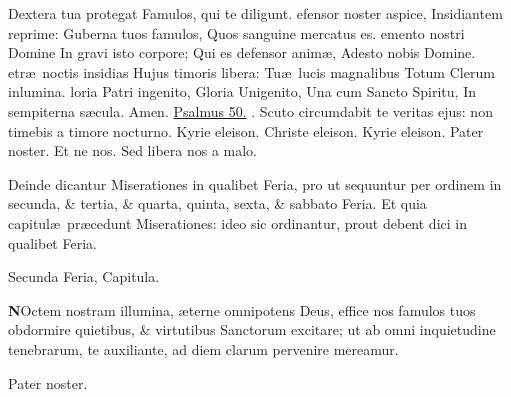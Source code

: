 \documentclass[letter,11pt]{book}
\makeatletter
\DeclareRobustCommand{\Vbar}{\vers@resp{-0.1em}{V}}
\newcommand{\vers@resp@sym}{\raisebox{0.2ex}{\rotatebox[origin=c]{-20}{$\m@th\rceil$}}}
\newcommand{\vers@resp}[2]{%
  {\ooalign{\hidewidth\kern#1\vers@resp@sym\hidewidth\cr#2\cr}}%
}%
\def\V{\color{Red} \Vbar . \color{black}}
\makeatother
\begin{document}
\begin{multicols*}{2}
\newline \indent Dextera tua protegat
\newline \indent Famulos, qui te diligunt.
efensor noster aspice,
\newline \indent Insidiantem reprime:
\newline \indent Guberna tuos famulos,
\newline \indent Quos sanguine mercatus es.
emento nostri Domine
\newline \indent In gravi isto corpore;
\newline \indent Qui es defensor anim\ae ,
\newline \indent Adesto nobis Domine.
etr\ae \ noctis insidias
\newline \indent Hujus timoris libera:
\newline \indent Tu\ae \ lucis magnalibus
\newline \indent Totum Clerum inlumina.
loria Patri ingenito,
\newline \indent Gloria Unigenito,
\newline \indent Una cum Sancto Spiritu,
\newline \indent In sempiterna s\ae cula. Amen.
\newline \hyperlink{ps50}{Psalmus 50.} \V Scuto circumdabit te veritas ejus: non timebis a timore nocturno. Kyrie eleison. Christe eleison. Kyrie eleison. Pater noster. Et ne nos. Sed libera nos a malo.%
\par \color{Red} Deinde dicantur Miserationes in qualibet Feria, pro ut sequuntur per ordinem in secunda, \& tertia, \& quarta, quinta, sexta, \& sabbato Feria. Et quia capitul\ae \ pr\ae cedunt Miserationes: ideo sic ordinantur, prout debent dici in qualibet Feria. \color{black}
\vspace{-.5em} \begin{center} \color{Red} Secunda Feria, Capitula. \end{center} \vspace{-.5em}
\lettrine[lines=2]{\bfseries \color{Red} N}{}Octem nostram illumina, \ae terne omnipotens Deus, effice nos famulos tuos obdormire quietibus, \& virtutibus Sanctorum excitare; ut ab omni inquietudine tenebrarum, te auxiliante, ad diem clarum pervenire mereamur.
\par Pater noster.

\end{multicols*}
\end{document}
